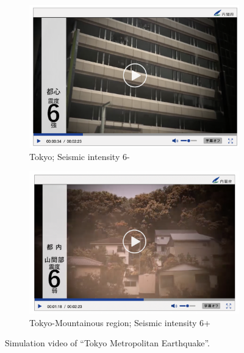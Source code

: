 \begin{figure}[h]
\begin{subfigure}{0.32\textwidth}
    \includegraphics[width=\linewidth]{Figure/Figure5f.jpg}
    \caption{Tokyo; Seismic intensity 6-}
    \label{fig5f}
  \end{subfigure}
  \begin{subfigure}{0.32\textwidth}
    \centering
    \includegraphics[width=\linewidth]{Figure/Figure5g.jpg}
    \caption{Tokyo-Mountainous region; Seismic intensity 6+}
    \label{fig5g}
  \end{subfigure}
  \centering
  \caption[Simulation video of “Tokyo Metropolitan Earthquake”.]{Simulation video of “Tokyo Metropolitan Earthquake”.\protect\footnotemark }
  \label{fig5}
\end{figure}
\fi


